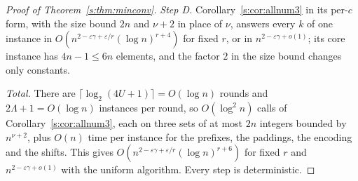 \documentclass[11pt]{article}
\theoremstyle{definition}
\theoremstyle{remark}
\begin{document}
\begin{proof}[Proof of Theorem~\ref{s:thm:minconv}]
\emph{Step D.} Corollary~\ref{s:cor:allnum3} in its per-$c$ form, with the size bound $2n$ and $\nu+2$ in place of $\nu$, answers every $k$ of one instance in $O(n^{2-\varepsilon\gamma+\varepsilon/r}(\log n)^{r+4})$ for fixed $r$, or in $n^{2-\varepsilon\gamma+o(1)}$; its core instance has $4n-1\le6n$ elements, and the factor $2$ in the size bound changes only constants.

\emph{Total.} There are $\lceil\log_2(4U+1)\rceil=O(\log n)$ rounds and $2\Lambda+1=O(\log n)$ instances per round, so $O(\log^2n)$ calls of Corollary~\ref{s:cor:allnum3}, each on three sets of at most $2n$ integers bounded by $n^{\nu+2}$, plus $O(n)$ time per instance for the prefixes, the paddings, the encoding and the shifts. This gives $O(n^{2-\varepsilon\gamma+\varepsilon/r}(\log n)^{r+6})$ for fixed $r$ and $n^{2-\varepsilon\gamma+o(1)}$ with the uniform algorithm. Every step is deterministic.
\end{proof}
\end{document}
